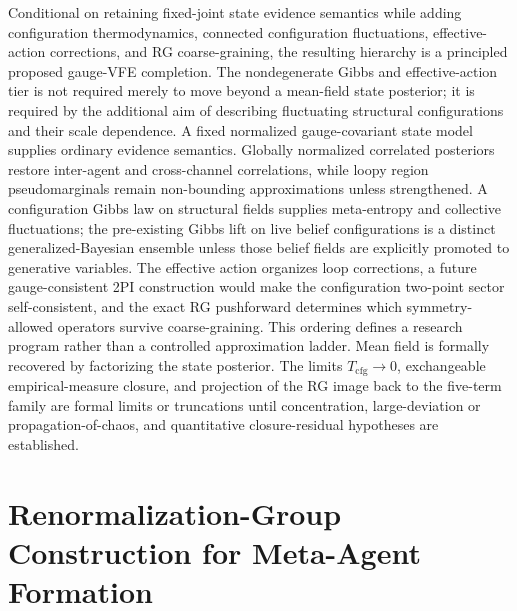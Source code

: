\documentclass[11pt]{article}
\begin{document}
Conditional on retaining fixed-joint state evidence semantics while adding configuration thermodynamics, connected configuration fluctuations, effective-action corrections, and RG coarse-graining, the resulting hierarchy is a principled proposed gauge-VFE completion. The nondegenerate Gibbs and effective-action tier is not required merely to move beyond a mean-field state posterior; it is required by the additional aim of describing fluctuating structural configurations and their scale dependence. A fixed normalized gauge-covariant state model supplies ordinary evidence semantics. Globally normalized correlated posteriors restore inter-agent and cross-channel correlations, while loopy region pseudomarginals remain non-bounding approximations unless strengthened. A configuration Gibbs law on structural fields supplies meta-entropy and collective fluctuations; the pre-existing Gibbs lift on live belief configurations is a distinct generalized-Bayesian ensemble unless those belief fields are explicitly promoted to generative variables. The effective action organizes loop corrections, a future gauge-consistent 2PI construction would make the configuration two-point sector self-consistent, and the exact RG pushforward determines which symmetry-allowed operators survive coarse-graining. This ordering defines a research program rather than a controlled approximation ladder. Mean field is formally recovered by factorizing the state posterior. The limits $T_{\mathrm{cfg}}\to0$, exchangeable empirical-measure closure, and projection of the RG image back to the five-term family are formal limits or truncations until concentration, large-deviation or propagation-of-chaos, and quantitative closure-residual hypotheses are established.

\section{Renormalization-Group Construction for Meta-Agent Formation}
\label{sec:meta_agent_rg}
\end{document}
